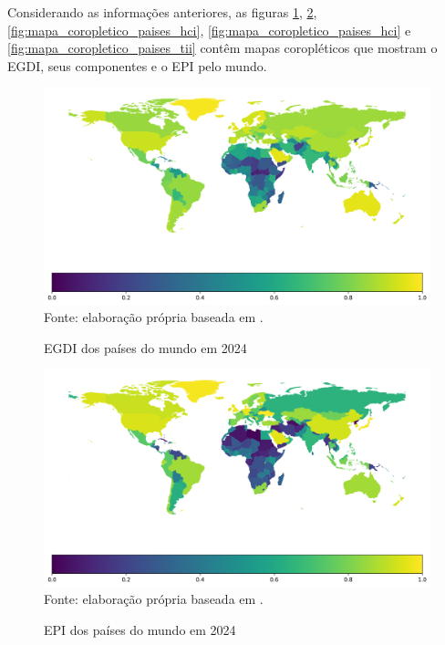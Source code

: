 Considerando as informações anteriores, as figuras \ref{fig:mapa_coropletico_paises_egdi}, \ref{fig:mapa_coropletico_paises_epi}, \ref{fig:mapa_coropletico_paises_hci}, \ref{fig:mapa_coropletico_paises_hci} e \ref{fig:mapa_coropletico_paises_tii} contêm mapas coropléticos que mostram o EGDI, seus componentes e o EPI pelo mundo.

\begin{figure}[H]
	\centering
	\caption{EGDI dos países do mundo em 2024}
	\includegraphics[width=1\linewidth]{figuras/mapa_coropletico_paises_egdi}
	\label{fig:mapa_coropletico_paises_egdi}
	\footnotesize{Fonte: elaboração própria baseada em \cite{ONU_EGDI_mapa}.}
\end{figure}

\begin{figure}[H]
	\centering
	\caption{EPI dos países do mundo em 2024}
	\includegraphics[width=1\linewidth]{figuras/mapa_coropletico_paises_epi}
	\label{fig:mapa_coropletico_paises_epi}
	\footnotesize{Fonte: elaboração própria baseada em \cite{ONU_EGDI_mapa}.}
\end{figure}

